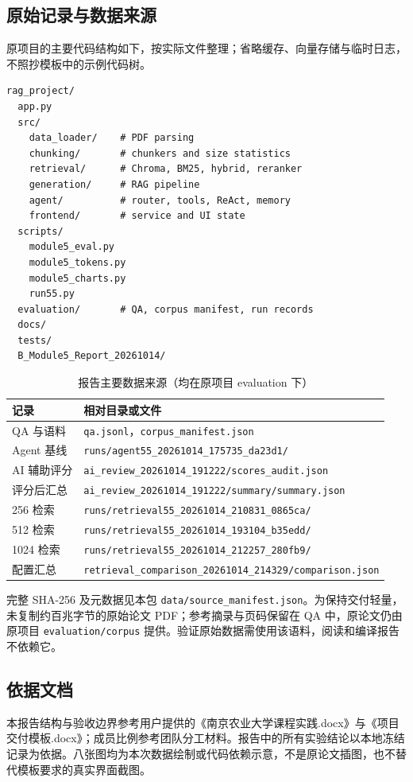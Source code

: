 \documentclass[UTF8,a4paper,zihao=-4,fontset=none]{ctexart}
\newcommand{\code}[1]{{\small\nolinkurl{#1}}}
\begin{document}
\subsection{原始记录与数据来源}
原项目的主要代码结构如下，按实际文件整理；省略缓存、向量存储与临时日志，不照抄模板中的示例代码树。
\begin{lstlisting}
rag_project/
  app.py
  src/
    data_loader/    # PDF parsing
    chunking/       # chunkers and size statistics
    retrieval/      # Chroma, BM25, hybrid, reranker
    generation/     # RAG pipeline
    agent/          # router, tools, ReAct, memory
    frontend/       # service and UI state
  scripts/
    module5_eval.py
    module5_tokens.py
    module5_charts.py
    run55.py
  evaluation/       # QA, corpus manifest, run records
  docs/
  tests/
  B_Module5_Report_20261014/
\end{lstlisting}
\begin{table}[H]\caption{报告主要数据来源（均在原项目 evaluation 下）}\small\centering
\begin{tabularx}{\linewidth}{@{}L{27mm}Y@{}}\toprule 记录 & 相对目录或文件\\\midrule
QA 与语料 & \code{qa.jsonl}，\code{corpus_manifest.json}\\
Agent 基线 & \code{runs/agent55_20261014_175735_da23d1/}\\
AI 辅助评分 & \code{ai_review_20261014_191222/scores_audit.json}\\
评分后汇总 & \code{ai_review_20261014_191222/summary/summary.json}\\
256 检索 & \code{runs/retrieval55_20261014_210831_0865ca/}\\
512 检索 & \code{runs/retrieval55_20261014_193104_b35edd/}\\
1024 检索 & \code{runs/retrieval55_20261014_212257_280fb9/}\\
配置汇总 & \code{retrieval_comparison_20261014_214329/comparison.json}\\\bottomrule\end{tabularx}
\end{table}
完整 SHA-256 及元数据见本包 \code{data/source_manifest.json}。为保持交付轻量，未复制约百兆字节的原始论文 PDF；参考摘录与页码保留在 QA 中，原论文仍由原项目 \code{evaluation/corpus} 提供。验证原始数据需使用该语料，阅读和编译报告不依赖它。

\subsection{依据文档}
本报告结构与验收边界参考用户提供的《南京农业大学课程实践.docx》与《项目交付模板.docx》；成员比例参考团队分工材料。报告中的所有实验结论以本地冻结记录为依据。八张图均为本次数据绘制或代码依赖示意，不是原论文插图，也不替代模板要求的真实界面截图。
\end{document}

